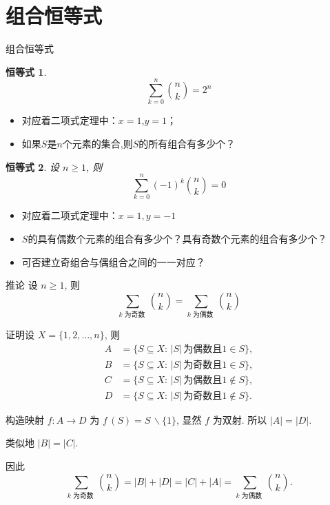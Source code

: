 \documentclass[punct]{ctexbeamer}
\newtheorem{iden}{恒等式}
\begin{document}
\section{组合恒等式}
\begin{frame}{组合恒等式}
	\begin{iden}
		$$
	\sum_{k=0}^n \binom{n}{k}=2^{n}
		$$
	\end{iden}
   \pause
	\begin{itemize}
	\item 对应着二项式定理中：$x = 1$,$y = 1$；
	\item 如果$S$是$n$个元素的集合,则$S$的所有组合有多少个？
	\end{itemize}
\end{frame}

\begin{frame}
	\begin{iden}设 $n \geq 1$, 则
	$$
	\sum_{k=0}^n (-1)^k \binom{n}{k}=0
	$$
	\end{iden}
\pause
	\begin{itemize}
    \item 对应着二项式定理中：$x = 1,y = -1$
    \item $S$的具有偶数个元素的组合有多少个？具有奇数个元素的组合有多少个？
    \item 可否建立奇组合与偶组合之间的一一对应？
\end{itemize}
\end{frame}

\begin{frame}
\begin{block}{推论}
设 $n \geq 1$, 则
$$
\sum_{k \text { 为奇数 }}\binom{n}{k} =\sum_{k \text { 为偶数 }}  \binom{n}{k}
$$
\end{block}


证明\quad  设 $X=\{1,2, \ldots, n\}$, 则
\begin{align*}
A& =\{S \subseteq X  : \, | S| \, \mbox{为偶数且} 1 \in S\}, \\
B&=\{S \subseteq X  : \,| S| \, \mbox{为奇数且} 1 \in S\},\\
C&=\{S \subseteq X  : \, | S| \, \mbox{为偶数且} 1 \notin S\},\\
D& =\{S \subseteq X  :  \,| S| \,  \mbox{为奇数且} 1 \notin S\}.
\end{align*}


 构造映射 $f: A \rightarrow D$ 为 $f\, (S)=S  \, \backslash\{1\}$, 显然 $f$ 为双射.
  所以 $|A|=|D|$.

 类似地 $|B|=|C|$.

  因此
$$
\sum_{k \text { 为奇数 }}\binom{n}{k}
=|B|+|D|=|C|+|A|
=\sum_{k \text { 为偶数 }}\binom{n}{k}.
$$

\end{frame}
\end{document}
